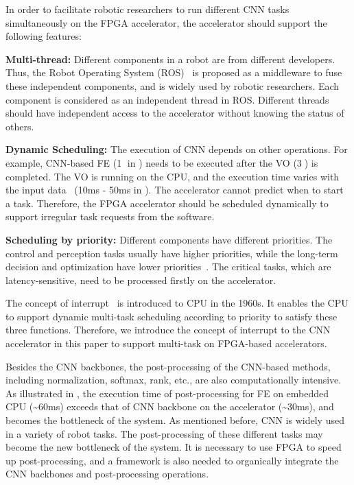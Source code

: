 In order to facilitate robotic researchers to run different CNN tasks simultaneously on the FPGA accelerator, the accelerator should support the following features:

\textbf{Multi-thread:} Different components in a robot are from different developers. Thus, the Robot Operating System (ROS)~\cite{quigley2009ros} is proposed as a middleware to fuse these independent components, and is widely used by robotic researchers. Each component is considered as an independent thread in ROS. Different threads should have independent access to the accelerator without knowing the status of others.



\textbf{Dynamic Scheduling:} The execution of CNN depends on other operations. For example, CNN-based FE (\textcircled{1} in ) needs to be executed after the VO (\textcircled{3}) is completed. 
The VO is running on the CPU, and the execution time varies with the input data~\cite{mohanan2018survey} (10ms - 50ms in ). 
The accelerator cannot predict when to start a task. 
Therefore, the FPGA accelerator should be scheduled dynamically to support irregular task requests from the software.

\textbf{Scheduling by priority:} Different components have different priorities. The control and perception tasks usually have higher priorities, while the long-term decision and optimization have lower priorities~\cite{RamsauerKLM17}. The critical tasks, which are latency-sensitive, need to be processed firstly on the accelerator.

The concept of interrupt~\cite{jen1974processor} is introduced to CPU in the 1960s. It enables the CPU to support dynamic multi-task scheduling according to priority to satisfy these three functions. Therefore, we introduce the concept of interrupt to the CNN accelerator in this paper to support multi-task on FPGA-based accelerators.

Besides the CNN backbones, the post-processing of the CNN-based methods, including normalization, softmax, rank, etc., are also computationally intensive. As illustrated in , the execution time of post-processing for FE on embedded CPU (\textasciitilde 60ms) exceeds that of CNN backbone on the accelerator (\textasciitilde 30ms), and becomes the bottleneck of the system. 
As mentioned before, CNN is widely used in a variety of robot tasks.
The post-processing of these different tasks may become the new bottleneck of the system.
It is necessary to use FPGA to speed up post-processing, and a framework is also needed to organically integrate the CNN backbones and post-processing operations.

